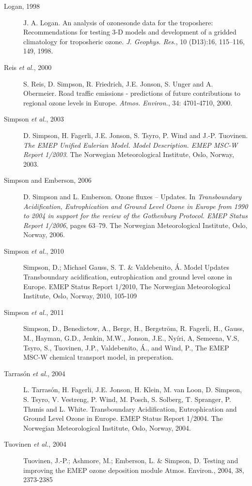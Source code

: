 \begin{description}
\item[Logan, 1998] J. A. Logan. An analysis of ozonesonde data for the
  troposhere: Recommendations for testing 3-D models and development
  of a gridded climatology for troposheric ozone. {\it
    J. Geophys. Res.}, 10 (D13):16, 115--116, 149, 1998.


\item[Reis {\sl et al.}, 2000] S. Reis, D. Simpson, R. Friedrich,
  J.E. Jonson, S. Unger and A. Obermeier. Road traffic emissions -
  predictions of future  contributions to regional ozone levels in Europe.
{\it Atmos. Environ.}, 34: 4701-4710, 2000.

\item[Simpson {\sl et al.}, 2003] D. Simpson, H. Fagerli, J.E. Jonson, 
                    S. Tsyro, P. Wind and J.-P. Tuovinen.
{\it The EMEP Unified Eulerian Model. Model Description. EMEP MSC-W Report
1/2003}. The Norwegian
Meteorological Institute, Oslo, Norway, 2003.


\item[Simpson and Emberson, 2006] D. Simpson and L. Emberson. Ozone
  fluxes -- Updates.  
 In {\it Transboundary Acidification,
  Eutrophication  and Ground Level Ozone in Europe from 1990 to 2004
  in support for the review of the Gothenburg Protocol. EMEP Status
                   Report 1/2006}, pages 63--79. The Norwegian
Meteorological Institute, Oslo, Norway, 2006. 

\item[Simpson {\sl et al.}, 2010]
Simpson, D.; Michael Gauss, S. T. \& Valdebenito, \'A. Model Updates Transboundary acidification, eutrophication and ground level ozone in Europe. EMEP Status Report 1/2010, The Norwegian Meteorological Institute, Oslo, Norway, 2010, 105-109

\item[Simpson {\sl et al.}, 2011]
Simpson, D., Benedictow, A., Berge, H., Bergstr\"om, R.  Fagerli, H., Gauss, M., Hayman, G.D., Jenkin, M.W., Jonson, J.E., Ny\'iri, A, Semeena, V.S, Tsyro, S., Tuovinen, J.P., Valdebenito, \'A., and Wind, P.,
The EMEP  MSC-W chemical transport model, in preperation.

\item[Tarras\'on {\sl et al.}, 2004] L. Tarras{\'o}n, H. Fagerli, 
              J.E. Jonson, H. Klein, M. van Loon,  
                   D. Simpson, S. Tsyro, V. Vestreng,
                   P. Wind, M. Posch, S. Solberg, T. Spranger,
                   P. Thunis and L. White. Transboundary
                   Acidification, Eutrophication 
                   and Ground Level Ozone in Europe. EMEP Status
                   Report 1/2004. The Norwegian
Meteorological Institute, Oslo, Norway, 2004. 

\item[Tuovinen {\sl et al.}, 2004] Tuovinen, J.-P.; Ashmore, M.; Emberson, L. \& Simpson, D. Testing and improving the EMEP ozone deposition module Atmos. Environ., 2004, 38, 2373-2385



\end{description}
